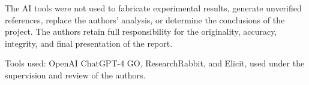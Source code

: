 The AI tools were not used to fabricate experimental results, generate unverified references, replace the authors' analysis, or determine the conclusions of the project. The authors retain full responsibility for the originality, accuracy, integrity, and final presentation of the report.

Tools used: OpenAI ChatGPT-4 GO, ResearchRabbit, and Elicit, used under the supervision and review of the authors.
